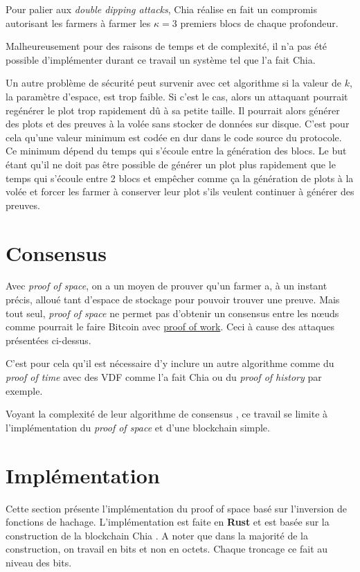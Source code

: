 Pour palier aux \emph{double dipping attacks}, Chia réalise en fait un compromis autorisant les farmers à farmer les $\kappa = 3$ premiers blocs de chaque profondeur.

Malheureusement pour des raisons de temps et de complexité, il n'a pas été possible d'implémenter durant ce travail un système tel que l'a fait Chia.

Un autre problème de sécurité peut survenir avec cet algorithme si la valeur de $k$, la paramètre d'espace, est trop faible. Si c'est le cas, alors un attaquant pourrait regénérer le plot trop rapidement dû à sa petite taille. Il pourrait alors générer des plots et des preuves à la volée sans stocker de données sur disque. C'est pour cela qu'une valeur minimum est codée en dur dans le code source du protocole. Ce minimum dépend du temps qui s'écoule entre la génération des blocs. Le but étant qu'il ne doit pas être possible de générer un plot plus rapidement que le temps qui s'écoule entre 2 blocs et empêcher comme ça la génération de plots à la volée et forcer les farmer à conserver leur plot s'ils veulent continuer à générer des preuves.

\section{Consensus}

Avec \emph{proof of space}, on a un moyen de prouver qu'un farmer a, à un instant précis, alloué tant d'espace de stockage pour pouvoir trouver une preuve. Mais tout seul, \emph{proof of space} ne permet pas d'obtenir un consensus entre les nœuds comme pourrait le faire Bitcoin avec \hyperref[consensus:pow]{proof of work}. Ceci à cause des attaques présentées ci-dessus.

C'est pour cela qu'il est nécessaire d'y inclure un autre algorithme comme du \emph{proof of time} avec des VDF comme l'a fait Chia ou du \emph{proof of history} par exemple.

Voyant la complexité de leur algorithme de consensus \cite{chia:consensus}, ce travail se limite à l'implémentation du \emph{proof of space} et d'une blockchain simple.

\section{Implémentation}

Cette section présente l'implémentation du proof of space basé sur l'inversion de fonctions de hachage. L'implémentation est faite en \textbf{Rust} et est basée sur la construction de la blockchain Chia \cite{chia:construction}. A noter que dans la majorité de la construction, on travail en bits et non en octets. Chaque troncage ce fait au niveau des bits.

